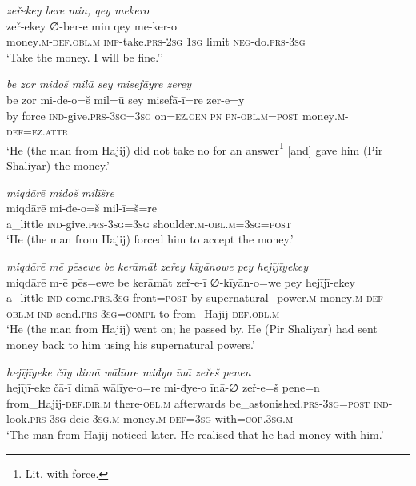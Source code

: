 \ea \label{ŽP.104}
\textit{zeřekey bere min, qey mekero} \\ 
\gll zeř-ekey ∅-ber-e min qey me-ker-o \\ 
 money\textsc{.m}\textsc{-def}\textsc{.obl}\textsc{.m} \textsc{imp-}take\textsc{.prs}-\textsc{2sg} \textsc{1sg} limit \textsc{neg-}do\textsc{.prs}\textsc{-3sg} \\ 
\glt `Take the money. I will be fine.’'
\z 
 
\ea \label{ŽP.107}
\textit{be zor miđoš milū sey misefāyre zerey} \\ 
\gll be zor mi-đe-o=š mil=ū sey misefā-ī=re zer-e=y \\ 
 by force \textsc{ind-}give\textsc{.prs}\textsc{-3sg}\textsc{=3sg} on\textsc{\textsc{=ez.gen}} \textsc{pn} \textsc{pn}\textsc{-obl}\textsc{.m}\textsc{=\textsc{post}} money\textsc{.m}\textsc{-def}\textsc{=ez}.\textsc{attr} \\ 
\glt `He (the man from Hajij) did not take no for an answer\footnote{Lit. with force.} [and] gave him (Pir Shaliyar) the money.'
\z 
 
\ea \label{ŽP.108}
\textit{miqdārē miđoš milīšre} \\ 
\gll miqdārē mi-đe-o=š mil-ī=š=re \\ 
 a\_little \textsc{ind-}give\textsc{.prs}\textsc{-3sg}\textsc{=3sg} shoulder\textsc{.m}\textsc{-obl}\textsc{.m}\textsc{=3sg}\textsc{=\textsc{post}} \\ 
\glt `He (the man from Hajij) forced him to accept the money.'
\z 
 
\ea \label{ŽP.109}
\textit{miqdārē mē pēsewe be kerāmāt zeřey kīyānowe pey hejījīyekey} \\ 
\gll miqdārē m-ē pēs=ewe be kerāmāt zeř-e-ī ∅-kīyān-o=we pey hejījī-ekey \\ 
 a\_little \textsc{ind-}come\textsc{.prs}\textsc{.3sg} front\textsc{=\textsc{post}} by supernatural\_power\textsc{.m} money\textsc{.m}\textsc{-def}\textsc{-obl}\textsc{.m} \textsc{ind-}send\textsc{.prs}\textsc{-3sg}\textsc{=compl} to from\_Hajij\textsc{-def}\textsc{.obl}\textsc{.m} \\ 
\glt `He (the man from Hajij) went on; he passed by. He (Pir Shaliyar) had sent money back to him using his supernatural powers.'
\z 
 
\ea \label{ŽP.112}
\textit{hejījīyeke čāy dimā wālīore miđyo īnā zeřeš penen} \\ 
\gll hejījī-eke čā-ī dimā wālīye-o=re mi-đye-o īnā-∅ zeř-e=š pene=n \\ 
 from\_Hajij\textsc{-def}\textsc{.dir}\textsc{.m} there\textsc{-obl}\textsc{.m} afterwards be\_astonished\textsc{.prs}\textsc{-3sg}\textsc{=\textsc{post}} \textsc{ind-}look\textsc{.prs}\textsc{-3sg} deic\textsc{-3sg}\textsc{.m} money\textsc{.m}\textsc{-def}\textsc{=3sg} with\textsc{=cop}\textsc{.3sg}\textsc{.m} \\ 
\glt `The man from Hajij noticed later. He realised that he had money with him.'
\z 
 
